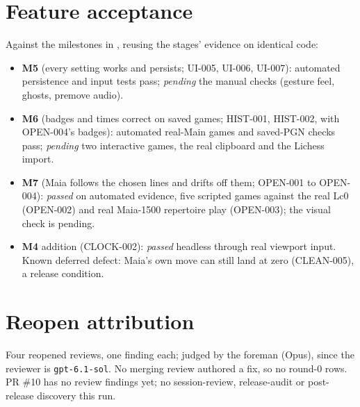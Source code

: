 \documentclass[11pt,a4paper]{article}
\begin{document}
\section*{Feature acceptance}

Against the milestones in , reusing the stages' evidence on identical code:

\begin{itemize}
  \item \textbf{M5} (every setting works and persists; UI-005, UI-006, UI-007): automated
        persistence and input tests pass; \emph{pending} the manual checks (gesture feel,
        ghosts, premove audio).
  \item \textbf{M6} (badges and times correct on saved games; HIST-001, HIST-002, with
        OPEN-004's badges): automated real-Main games and saved-PGN checks pass;
        \emph{pending} two interactive games, the real clipboard and the Lichess import.
  \item \textbf{M7} (Maia follows the chosen lines and drifts off them; OPEN-001 to OPEN-004):
        \emph{passed} on automated evidence, five scripted games against the real Lc0
        (OPEN-002) and real Maia-1500 repertoire play (OPEN-003); the visual check is pending.
  \item \textbf{M4} addition (CLOCK-002): \emph{passed} headless through real viewport input.
        Known deferred defect: Maia's own move can still land at zero (CLEAN-005), a release
        condition.
\end{itemize}

\section*{Reopen attribution}

Four reopened reviews, one finding each; judged by the foreman (Opus), since the reviewer is
\texttt{gpt-6.1-sol}. No merging review authored a fix, so no round-0 rows. PR \#10 has no
review findings yet; no session-review, release-audit or post-release discovery this run.
\end{document}
